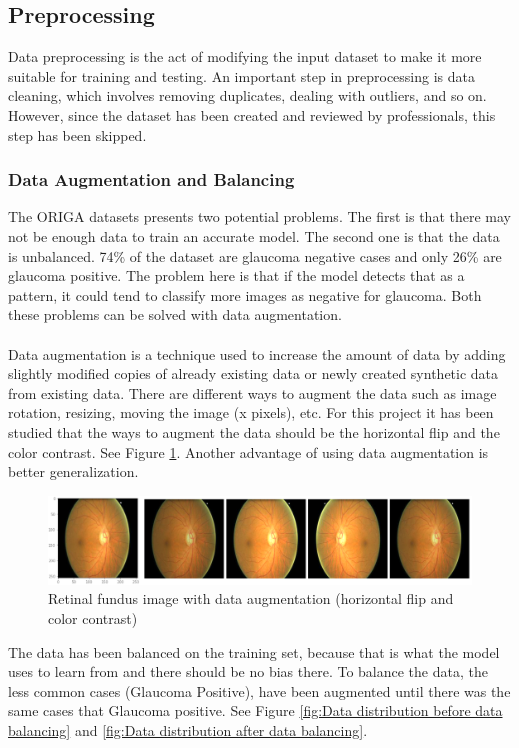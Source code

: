 \documentclass[11pt, a4paper]{article}
\begin{document}
\subsection{Preprocessing}
Data preprocessing is the act of modifying the input dataset to make it more suitable for training and testing. An important step in preprocessing is data cleaning, which involves removing duplicates, dealing with outliers, and so on. However, since the dataset has been created and reviewed by professionals, this step has been skipped.

\subsubsection{Data Augmentation and Balancing}
The ORIGA datasets presents two potential problems. The first is that there may not be enough data to train an accurate model. The second one is that the data is unbalanced. 74\% of the dataset are glaucoma negative cases and only 26\% are glaucoma positive. The problem here is that if the model detects that as a pattern, it could tend to classify more images as negative for glaucoma. Both these problems can be solved with data augmentation.
\\\\
Data augmentation is a technique used to increase the amount of data by adding slightly modified copies of already existing data or newly created synthetic data from existing data. There are different ways to augment the data such as image rotation, resizing, moving the image (x pixels), etc. For this project it has been studied that the ways to augment the data should be the horizontal flip and the color contrast. See Figure \ref{fig:Retinal fundus image with its augmentations}. Another advantage of using data augmentation is better generalization.
\begin{figure}[H]
	\centering
	\includegraphics[width=15cm]{imgs/general/Retinal fundus image with its augmentations.png}
	\caption{Retinal fundus image with data augmentation (horizontal flip and color contrast)}
	 \label{fig:Retinal fundus image with its augmentations}
\end{figure}
\noindent The data has been balanced on the training set, because that is what the model uses to learn from and there should be no bias there. To balance the data, the less common cases (Glaucoma Positive), have been augmented until there was the same cases that Glaucoma positive. See Figure \ref{fig:Data distribution before data balancing} and \ref{fig:Data distribution after data balancing}.
\end{document}
